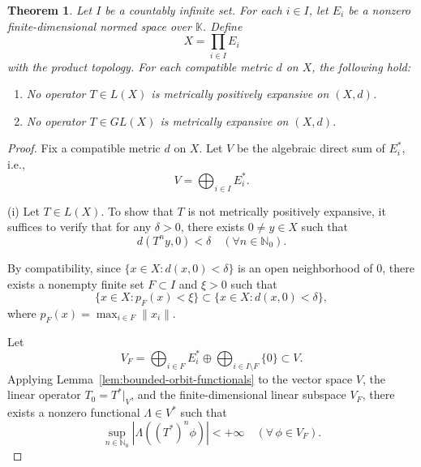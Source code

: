 \documentclass[11pt]{amsart}
\newtheorem{theorem}{Theorem}
\theoremstyle{definition}
\theoremstyle{remark}
\theoremstyle{plain}
\begin{document}
\begin{theorem}\label{thm:countable-products-no-metric-expansive}
Let \(I\) be a countably infinite set.  For each \(i\in I\), let
\(E_i\) be a nonzero finite-dimensional normed space over
\(\mathbb{K}\).  Define
\[
X=\prod_{i\in I}E_i
\]
with the product topology.  For each compatible metric \(d\) on \(X\),
the following hold:
\begin{enumerate}[{\rm (i)}]
  \item No
operator \(T\in L(X)\) is metrically positively expansive on \((X,d)\).
  \item No
operator \(T\in GL(X)\) is metrically expansive on \((X,d)\).
\end{enumerate}
\end{theorem}

\begin{proof}
Fix a compatible metric \(d\) on \(X\). Let \(V\) be the algebraic direct sum
of $E_i^{*}$, i.e.,
\[
V=\bigoplus_{i\in I}E_i^*.
\]


(i)
Let \(T\in L(X)\). To show that \(T\) is not metrically positively
expansive, it suffices to verify that for any \(\delta>0\), there exists
\(0\ne y\in X\) such that
\[
d(T^n y,0)<\delta
\quad(\forall n\in\mathbb{N}_0).
\]

By compatibility, since \(\{x\in X:d(x,0)<\delta\}\) is an open
neighborhood of \(0\), there exists a nonempty finite set
\(F\subset I\) and
\(\xi>0\) such that
\begin{equation}\label{eq:Choice-xi}
\{x\in X:p_F(x)<\xi\}
\subset
\{x\in X:d(x,0)<\delta\},
\end{equation}
where
\(p_F(x)=\max_{i\in F}\|x_i\|.\)

Let
\[
V_F=\bigoplus_{i\in F}E_i^*\oplus
\bigoplus_{i\in I\setminus F}\{0\}\subset V.
\]
Applying Lemma~\ref{lem:bounded-orbit-functionals} to the vector space \(V\),
the linear operator \(T_0=T^*|_V\), and the finite-dimensional linear subspace
\(V_F\),
there exists a nonzero functional \(\Lambda\in V^*\) such that
\begin{equation}\label{eq:Lamda_Condition}
\sup_{n\in\mathbb{N}_0}
|\Lambda((T^*)^n\phi)|
<+\infty
\quad
(\forall\,\phi\in V_F).
\end{equation}



\end{proof}
\end{document}
